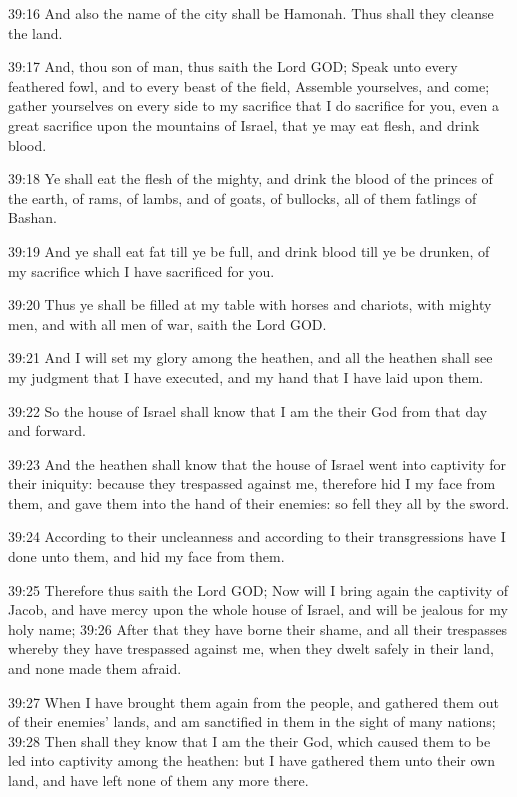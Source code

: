 39:16 And also the name of the city shall be Hamonah. Thus shall they
cleanse the land.

39:17 And, thou son of man, thus saith the Lord GOD; Speak unto every
feathered fowl, and to every beast of the field, Assemble yourselves,
and come; gather yourselves on every side to my sacrifice that I do
sacrifice for you, even a great sacrifice upon the mountains of
Israel, that ye may eat flesh, and drink blood.

39:18 Ye shall eat the flesh of the mighty, and drink the blood of the
princes of the earth, of rams, of lambs, and of goats, of bullocks,
all of them fatlings of Bashan.

39:19 And ye shall eat fat till ye be full, and drink blood till ye be
drunken, of my sacrifice which I have sacrificed for you.

39:20 Thus ye shall be filled at my table with horses and chariots,
with mighty men, and with all men of war, saith the Lord GOD.

39:21 And I will set my glory among the heathen, and all the heathen
shall see my judgment that I have executed, and my hand that I have
laid upon them.

39:22 So the house of Israel shall know that I am the \LORD their God
from that day and forward.

39:23 And the heathen shall know that the house of Israel went into
captivity for their iniquity: because they trespassed against me,
therefore hid I my face from them, and gave them into the hand of
their enemies: so fell they all by the sword.

39:24 According to their uncleanness and according to their
transgressions have I done unto them, and hid my face from them.

39:25 Therefore thus saith the Lord GOD; Now will I bring again the
captivity of Jacob, and have mercy upon the whole house of Israel, and
will be jealous for my holy name; 39:26 After that they have borne
their shame, and all their trespasses whereby they have trespassed
against me, when they dwelt safely in their land, and none made them
afraid.

39:27 When I have brought them again from the people, and gathered
them out of their enemies' lands, and am sanctified in them in the
sight of many nations; 39:28 Then shall they know that I am the \LORD
their God, which caused them to be led into captivity among the
heathen: but I have gathered them unto their own land, and have left
none of them any more there.

